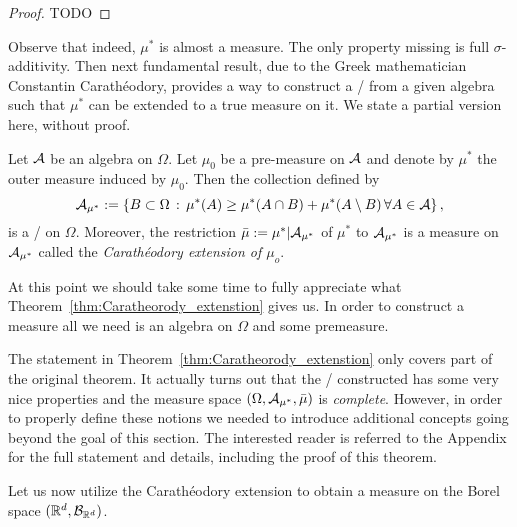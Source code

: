 \begin{proof}
TODO
\end{proof}

Observe that indeed, $\mu^\ast$ is almost a measure. The only property missing is full $\sigma$-additivity. Then next fundamental result, due to the Greek mathematician Constantin Carath\'{e}odory, provides a way to construct a \sigalg/ from a given algebra such that $\mu^\ast$ can be extended to a true measure on it. We state a partial version here, without proof.

\begin{theorem}\label{thm:Caratheorody_extenstion}
Let $\mathcal A$ be an algebra on $\Omega$. Let $\mu_0$ be a pre-measure on $\mathcal A$ and denote by $\mu^\ast$ the outer measure induced by $\mu_0$. Then the collection defined by
\[
	\mathcal A_{\mu^\ast} := \left\{B \subset \Omega \, : \, \mu^\ast(A) \ge \mu^\ast(A \cap B) + \mu^\ast(A \setminus B) \, \forall A \in \mathcal A\right\},
\] 
is a \sigalg/ on $\Omega$. Moreover, the restriction $\bar{\mu} := \mu^\ast|\mathcal A_{\mu^\ast}$ of $\mu^\ast$ to $\mathcal A_{\mu^\ast}$ is a measure on $\mathcal A_{\mu^\ast}$ called the \emph{Carath\'{e}odory extension of $\mu_o$}.
\end{theorem}

At this point we should take some time to fully appreciate what Theorem~\ref{thm:Caratheorody_extenstion} gives us. In order to construct a measure all we need is an algebra on $\Omega$ and some premeasure.  

\begin{remark}
The statement in Theorem~\ref{thm:Caratheorody_extenstion} only covers part of the original theorem. It actually turns out that the \sigalg/ constructed has some very nice properties and the measure space $(\Omega, \mathcal A_{\mu^\ast}, \bar{\mu})$ is \emph{complete}. However, in order to properly define these notions we needed to introduce additional concepts going beyond the goal of this section. The interested reader is referred to the Appendix for the full statement and details, including the proof of this theorem. 
\end{remark}

Let us now utilize the Carath\'{e}odory extension to obtain a measure on the Borel space $(\mathbb R^d, \mathcal B_{\mathbb R^d})$. 

